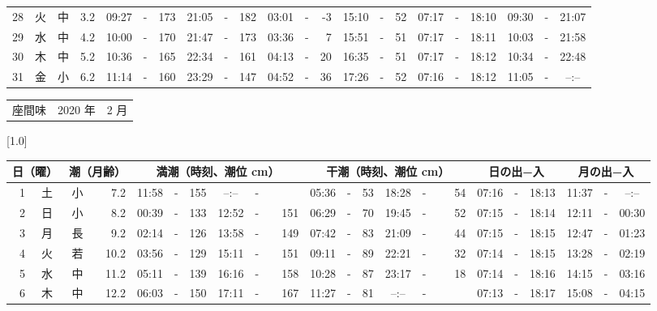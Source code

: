 \documentclass[12pt,a4j]{jsarticle}
\begin{document}
\begin{table}[htbp]
\begin{center}
{\begin{tabular}{|rc|cr|ccrccr|ccrccr|ccc|ccc|}
28 & 火 & 中 &  3.2 &  09:27 &-& 173 &  21:05 &-& 182 &  03:01 &-&  -3 &  15:10 &-&  52 & 07:17 & -& 18:10 & 09:30 & -& 21:07 \\
29 & 水 & 中 &  4.2 &  10:00 &-& 170 &  21:47 &-& 173 &  03:36 &-&   7 &  15:51 &-&  51 & 07:17 & -& 18:11 & 10:03 & -& 21:58 \\
30 & 木 & 中 &  5.2 &  10:36 &-& 165 &  22:34 &-& 161 &  04:13 &-&  20 &  16:35 &-&  51 & 07:17 & -& 18:12 & 10:34 & -& 22:48 \\
31 & 金 & 小 &  6.2 &  11:14 &-& 160 &  23:29 &-& 147 &  04:52 &-&  36 &  17:26 &-&  52 & 07:16 & -& 18:12 & 11:05 & -& --:-- \\
   \hline
   \end{tabular}}
   \end{center}
\end{table}
\newpage
 \begin{table}[htbp]
 \begin{center}
 \begin{tabular}{lcc}
 \LARGE{座間味}  & \large{2020 年} & \large{ 2 月} \\
 \end{tabular}
 \end{center}
 \begin{center}
    \scalebox{0.7}[1.0]{
    \begin{tabular}{|rc|cr|ccrccr|ccrccr|ccc|ccc|}
    \hline
    \multicolumn{2}{|c|}{日（曜）} & \multicolumn{2}{c|}{潮（月齢）} & \multicolumn{6}{c|}{満潮（時刻、潮位 cm）} & \multicolumn{6}{c|}{干潮（時刻、潮位 cm）} & \multicolumn{3}{c|}{日の出−入} &  \multicolumn{3}{c|}{月の出−入}\\
 \hline
 1 & 土 & 小 &  7.2 &  11:58 &-& 155 &  --:-- &-&~~~~~ &  05:36 &-&  53 &  18:28 &-&  54 & 07:16 & -& 18:13 & 11:37 & -& --:-- \\
 2 & 日 & 小 &  8.2 &  00:39 &-& 133 &  12:52 &-& 151 &  06:29 &-&  70 &  19:45 &-&  52 & 07:15 & -& 18:14 & 12:11 & -& 00:30 \\
 3 & 月 & 長 &  9.2 &  02:14 &-& 126 &  13:58 &-& 149 &  07:42 &-&  83 &  21:09 &-&  44 & 07:15 & -& 18:15 & 12:47 & -& 01:23 \\
 4 & 火 & 若 & 10.2 &  03:56 &-& 129 &  15:11 &-& 151 &  09:11 &-&  89 &  22:21 &-&  32 & 07:14 & -& 18:15 & 13:28 & -& 02:19 \\
 5 & 水 & 中 & 11.2 &  05:11 &-& 139 &  16:16 &-& 158 &  10:28 &-&  87 &  23:17 &-&  18 & 07:14 & -& 18:16 & 14:15 & -& 03:16 \\
 6 & 木 & 中 & 12.2 &  06:03 &-& 150 &  17:11 &-& 167 &  11:27 &-&  81 &  --:-- &-&~~~~~ & 07:13 & -& 18:17 & 15:08 & -& 04:15 \\

\end{tabular}}
\end{center}
\end{table}
\end{document}
